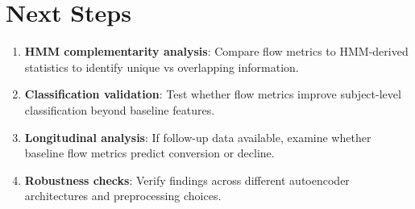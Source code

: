 \documentclass[5p,twocolumn,authoryear]{elsarticle}
\begin{document}
\section{Next Steps}

\begin{enumerate}
    \item \textbf{HMM complementarity analysis}: Compare flow metrics to HMM-derived statistics to identify unique vs overlapping information.

    \item \textbf{Classification validation}: Test whether flow metrics improve subject-level classification beyond baseline features.

    \item \textbf{Longitudinal analysis}: If follow-up data available, examine whether baseline flow metrics predict conversion or decline.

    \item \textbf{Robustness checks}: Verify findings across different autoencoder architectures and preprocessing choices.
\end{enumerate}
\end{document}
